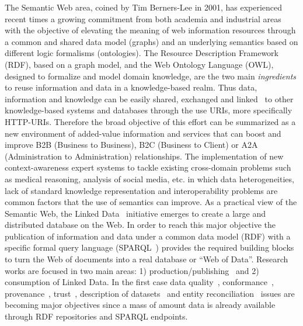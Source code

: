 The Semantic Web area, coined by Tim Berners-Lee in 2001, has experienced recent times a growing 
commitment from both academia and industrial areas  with the objective of elevating the meaning of web 
information resources through a common and shared data model (graphs) and an underlying semantics based 
on different logic formalisms (ontologies). The Resource Description Framework (RDF), based on a graph model, and the Web Ontology Language (OWL), 
designed to formalize and model domain knowledge, are the two main \textit{ingredients} to reuse information and data 
in a knowledge-based realm. Thus data, information and knowledge can be easily shared, exchanged and linked~\cite{Maali_Cyganiak_2011} 
to other knowledge-based systems and databases through the use URIs, more specifically HTTP-URIs. Therefore the broad objective of this effort can be summarized 
as a new environment of added-value information and services that can boost and improve B2B (Business to Business), B2C (Business to Client) or 
A2A (Administration to Administration) relationships. The implementation of new context-awareness expert systems to tackle existing 
cross-domain problems such as medical reasoning, analysis of social media, etc. in which data heterogeneities, 
lack of standard knowledge representation and interoperability problems are common factors that the use of semantics can improve. As a practical view of the Semantic Web, 
the Linked Data~\cite{Berners-Lee-2006,Heath_Bizer_2011} initiative emerges to create a large and distributed database on the Web. 
In order to reach this major objective the publication of information and data under a common data model (RDF) 
with a specific formal query language (SPARQL~\cite{Sparql11}) provides the required building blocks to turn the Web of documents 
into a real database or ``Web of Data''. Research works are focused in two main areas: 1) production/publishing~\cite{bizer07how} and 2) consumption of 
Linked Data. In the first case data quality~\cite{bizer2007,Bizer2009QA,lodq,link-qa}, conformance~\cite{DBLP:journals/ws/HoganUHCPD12}, 
provenance~\cite{w3c-prov,DBLP:conf/ipaw/HartigZ10}, trust~\cite{Carroll05namedgraphs}, description of 
datasets~\cite{void,Cyganiak08semanticsitemaps,ckanValidator} and entity reconciliation~\cite{Serimi,Maali_Cyganiak_2011} issues are 
becoming major objectives since a mass of amount data is already available through RDF repositories and SPARQL endpoints. 

